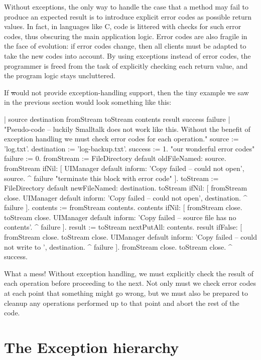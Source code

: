 \documentclass[a4paper,10pt,twoside]{book}
\begin{document}
Without exceptions, the only way to handle the case that a method may fail to produce an expected result is to introduce explicit error codes as possible return values. In fact, in languages like C, code is littered with checks for such error codes, thus obscuring the main application logic.
Error codes are also fragile in the face of evolution: if error codes change, then all clients must be adapted to take the new codes into account. By using exceptions instead of error codes, the programmer is freed from the task of explicitly checking each return value, and the program logic stays uncluttered.

If \st would not provide exception-handling support, then the tiny example we saw in the previous section would look something like this:

\begin{code}{| source destination fromStream toStream contents result success failure |}
"Pseudo-code -- luckily Smalltalk does not work like this. Without the 
benefit of exception handling we must check error codes for each operation."
source := 'log.txt'.
destination := 'log-backup.txt'.
success := 1. "our wonderful error codes"
failure := 0.
fromStream := FileDirectory default oldFileNamed: source.
fromStream ifNil: [
	UIManager default inform: 'Copy failed -- could not open', source.
	^ failure "terminate this block with error code" ].
toStream := FileDirectory default newFileNamed: destination.
toStream ifNil: [
	fromStream close.
	UIManager default inform: 'Copy failed -- could not open', destination.
	^ failure ].
contents := fromStream contents.
contents ifNil: [
	fromStream close.
	toStream close.
	UIManager default inform: 'Copy failed -- source file has no contents'.
	^ failure ].
result := toStream nextPutAll: contents.
result ifFalse: [
	fromStream close.
	toStream close.
	UIManager default inform: 'Copy failed -- could not write to ', destination.
	^ failure ].
fromStream close.
toStream close.
^ success.
\end{code}
\noindent
What a mess!
Without exception handling, we must explicitly check the result of each operation before proceeding to the next.
Not only must we check error codes at each point that something might go wrong, but we must also be prepared to cleanup any operations performed up to that point and abort the rest of the code.

\section{The Exception hierarchy}
\end{document}
